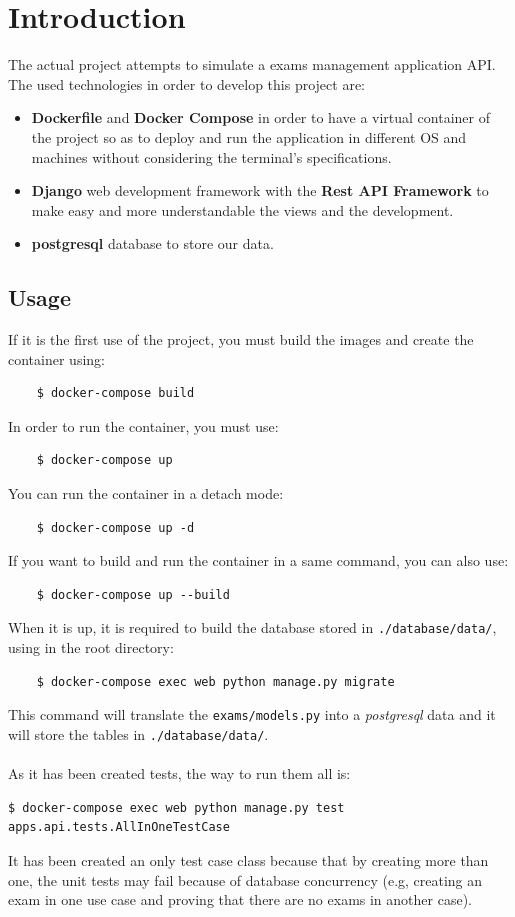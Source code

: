 \documentclass{article}
\begin{document}
\section{Introduction}
The actual project attempts to simulate a exams management application API. The used technologies in order to develop this project are:
\begin{itemize}
	\item \textbf{Dockerfile} and \textbf{Docker Compose} in order to have a virtual container of the project so as to deploy and run the application in different OS and machines without considering the terminal's specifications.
	\item \textbf{Django} web development framework with the \textbf{Rest API Framework} to make easy and more understandable the views and the development.
	\item \textbf{postgresql} database to store our data.
\end{itemize} 
\subsection{Usage}
If it is the first use of the project, you must build the images and create the container using:
\begin{verbatim}
	$ docker-compose build
\end{verbatim}
In order to run the container, you must use:
\begin{verbatim}
	$ docker-compose up
\end{verbatim}
You can run the container in a detach mode:
\begin{verbatim}
	$ docker-compose up -d
\end{verbatim}
If you want to build and run the container in a same command, you can also use:
\begin{verbatim}
	$ docker-compose up --build
\end{verbatim}
When it is up, it is required to build the database stored in \texttt{./database/data/}, using in the root directory:
\begin{verbatim}
	$ docker-compose exec web python manage.py migrate
\end{verbatim}
This command will translate the \texttt{exams/models.py} into a \textit{postgresql} data and it will store the tables in \texttt{./database/data/}.
\\
\\
As it has been created tests, the way to run them all is:
\begin{verbatim}
$ docker-compose exec web python manage.py test apps.api.tests.AllInOneTestCase
\end{verbatim}
It has been created an only test case class because that by creating more than one, the unit tests may fail because of database concurrency (e.g, creating an exam in one use case and proving that there are no exams in another case).
\end{document}

